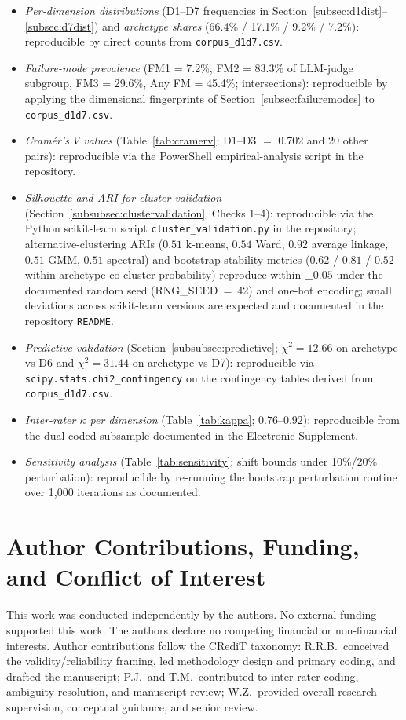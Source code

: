 \documentclass[acmsmall, nonacm, screen]{acmart}
\begin{document}
\begin{itemize}
\item \emph{Per-dimension distributions} (D1--D7 frequencies in
Section~\ref{subsec:d1dist}--\ref{subsec:d7dist}) and \emph{archetype
shares} (66.4\% / 17.1\% / 9.2\% / 7.2\%): reproducible by direct
counts from \texttt{corpus\_d1d7.csv}.
\item \emph{Failure-mode prevalence} (FM1 = 7.2\%, FM2 = 83.3\% of
LLM-judge subgroup, FM3 = 29.6\%, Any FM = 45.4\%; intersections):
reproducible by applying the dimensional fingerprints of
Section~\ref{subsec:failuremodes} to \texttt{corpus\_d1d7.csv}.
\item \emph{Cram\'{e}r's $V$ values} (Table~\ref{tab:cramerv}; D1--D3 $=$ 0.702
and 20 other pairs): reproducible via the PowerShell empirical-analysis
script in the repository.
\item \emph{Silhouette and ARI for cluster validation}
(Section~\ref{subsubsec:clustervalidation}, Checks 1--4):
reproducible via the Python scikit-learn script
\texttt{cluster\_validation.py} in the repository; alternative-clustering ARIs
($0.51$ k-means, $0.54$ Ward, $0.92$ average linkage,
$0.51$ GMM, $0.51$ spectral) and bootstrap stability metrics
($0.62$ / $0.81$ / $0.52$ within-archetype co-cluster
probability) reproduce within $\pm 0.05$ under the documented random
seed (RNG\_SEED~=~42) and one-hot encoding; small deviations across
scikit-learn versions are expected and documented in the repository
\texttt{README}.
\item \emph{Predictive validation}
(Section~\ref{subsubsec:predictive}; $\chi^2 = 12.66$ on archetype
vs D6 and $\chi^2 = 31.44$ on archetype vs D7): reproducible via
\texttt{scipy.stats.chi2\_contingency} on the contingency tables
derived from \texttt{corpus\_d1d7.csv}.
\item \emph{Inter-rater $\kappa$ per dimension}
(Table~\ref{tab:kappa}; $0.76$--$0.92$): reproducible from the
dual-coded subsample documented in the Electronic Supplement.
\item \emph{Sensitivity analysis} (Table~\ref{tab:sensitivity};
shift bounds under 10\%/20\% perturbation): reproducible by
re-running the bootstrap perturbation routine over 1{,}000
iterations as documented.
\end{itemize}

\section*{Author Contributions, Funding, and Conflict of Interest}
\label{sec:credits}
This work was conducted independently by the authors. No external
funding supported this work. The authors declare no competing
financial or non-financial interests. Author contributions follow
the CRediT taxonomy: R.R.B.\ conceived the validity/reliability
framing, led methodology design and primary coding, and drafted the
manuscript; P.J.\ and T.M.\ contributed to inter-rater coding,
ambiguity resolution, and manuscript review; W.Z.\ provided overall
research supervision, conceptual guidance, and senior review.
\end{document}
